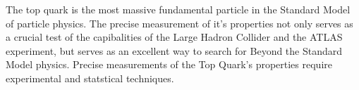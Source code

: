 %
The top quark is the most massive fundamental particle in the Standard Model of particle physics.
The precise measurement of it's properties not only serves as a crucial test of the capibalities of the Large Hadron Collider and the ATLAS experiment, but serves as an excellent way to search for Beyond the Standard Model physics.  
Precise measurements of the Top Quark's properties require experimental and statstical techniques.

